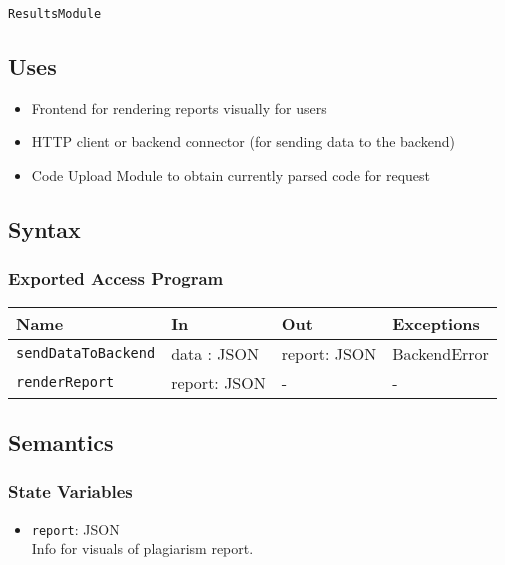 \documentclass[12pt, titlepage]{article}
\begin{document}
\texttt{ResultsModule}

\subsection{Uses}

\begin{itemize}
    \item Frontend for rendering reports visually for users
    \item HTTP client or backend connector (for sending data to the backend)
    \item Code Upload Module to obtain currently parsed code for request
\end{itemize}

\subsection{Syntax}

\subsubsection{Exported Access Program}

\begin{center}
\begin{tabular}{p{5cm} p{4cm} p{3.5cm} p{2cm}}
\hline
\textbf{Name} & \textbf{In} & \textbf{Out} & \textbf{Exceptions} \\
\hline
\texttt{sendDataToBackend} & data : JSON & report: JSON & BackendError \\
\texttt{renderReport} & report: JSON & - & - \\
\hline
\end{tabular}
\end{center}

\subsection{Semantics}

\subsubsection{State Variables}

\begin{itemize}
    \item \texttt{report}: JSON \\
    Info for visuals of plagiarism report.
\end{itemize}
\end{document}
